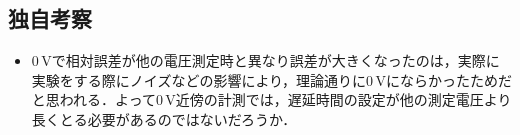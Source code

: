 \subsection{独自考察}
\begin{itemize}
\item 0\,\rm{V}で相対誤差が他の電圧測定時と異なり誤差が大きくなったのは，実際に実験をする際にノイズなどの影響により，理論通りに0\,\rm{V}にならかったためだと思われる．よって0\,\rm{V}近傍の計測では，遅延時間の設定が他の測定電圧より長くとる必要があるのではないだろうか．
\end{itemize}